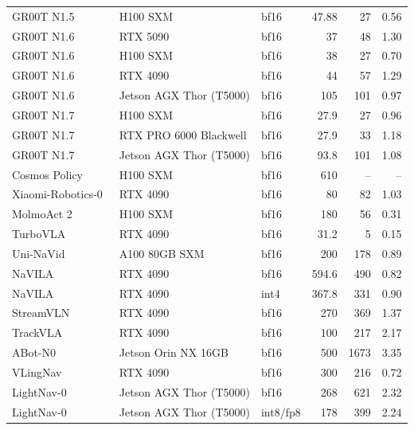 \begin{longtable}{@{}p{3.3cm} p{3.6cm} l r r r@{}}
GR00T N1.5~\cite{web-gr00t-n1-5} & H100 SXM & bf16 & 47.88 & 27 & 0.56\\
GR00T N1.6~\cite{web-gr00t-n1-6} & RTX 5090 & bf16 & 37 & 48 & 1.30\\
GR00T N1.6~\cite{web-gr00t-n1-6} & H100 SXM & bf16 & 38 & 27 & 0.70\\
GR00T N1.6~\cite{web-gr00t-n1-6} & RTX 4090 & bf16 & 44 & 57 & 1.29\\
GR00T N1.6~\cite{web-gr00t-n1-6} & Jetson AGX Thor (T5000) & bf16 & 105 & 101 & 0.97\\
GR00T N1.7~\cite{web-gr00t-n1-7} & H100 SXM & bf16 & 27.9 & 27 & 0.96\\
GR00T N1.7~\cite{web-gr00t-n1-7} & RTX PRO 6000 Blackwell & bf16 & 27.9 & 33 & 1.18\\
GR00T N1.7~\cite{web-gr00t-n1-7} & Jetson AGX Thor (T5000) & bf16 & 93.8 & 101 & 1.08\\
Cosmos Policy~\cite{ax260116163} & H100 SXM & bf16 & 610 & -- & --\\
Xiaomi-Robotics-0~\cite{ax260212684} & RTX 4090 & bf16 & 80 & 82 & 1.03\\
MolmoAct 2~\cite{ax260502881} & H100 SXM & bf16 & 180 & 56 & 0.31\\
TurboVLA~\cite{ax260727205} & RTX 4090 & bf16 & 31.2 & 5 & 0.15\\
Uni-NaVid~\cite{ax241206224} & A100 80GB SXM & bf16 & 200 & 178 & 0.89\\
NaVILA~\cite{ax241204453} & RTX 4090 & bf16 & 594.6 & 490 & 0.82\\
NaVILA~\cite{ax241204453} & RTX 4090 & int4 & 367.8 & 331 & 0.90\\
StreamVLN~\cite{ax250705240} & RTX 4090 & bf16 & 270 & 369 & 1.37\\
TrackVLA~\cite{ax250523189} & RTX 4090 & bf16 & 100 & 217 & 2.17\\
ABot-N0~\cite{ax260211598} & Jetson Orin NX 16GB & bf16 & 500 & 1673 & 3.35\\
VLingNav~\cite{ax260108665} & RTX 4090 & bf16 & 300 & 216 & 0.72\\
LightNav-0~\cite{ax260830935} & Jetson AGX Thor (T5000) & bf16 & 268 & 621 & 2.32\\
LightNav-0~\cite{ax260830935} & Jetson AGX Thor (T5000) & int8/fp8 & 178 & 399 & 2.24\\
\end{longtable}
